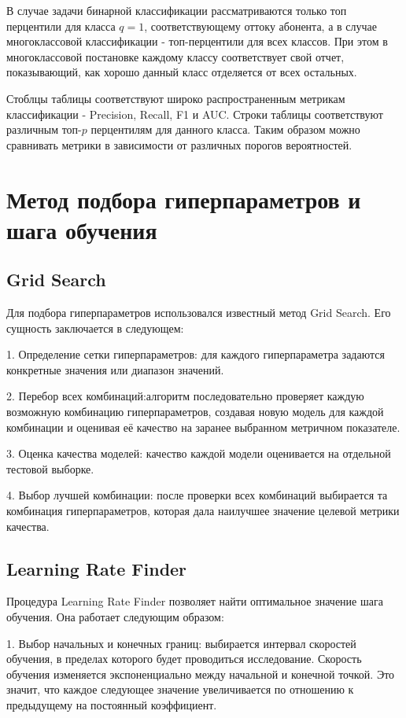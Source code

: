 \documentclass[a4paper,14pt,oneside,openany]{memoir}
\begin{document}
В случае задачи бинарной классификации рассматриваются только топ перцентили для класса $q = 1$, соответствующему оттоку абонента, а в случае многоклассовой классификации - топ-перцентили для всех классов. При этом в многоклассовой постановке каждому классу соответствует свой отчет, показывающий, как хорошо данный класс отделяется от всех остальных. 

Стоблцы таблицы соответствуют широко распространенным метрикам классификации - Precision, Recall, F1 и AUC. Строки таблицы соответствуют различным топ-$p$ перцентилям для данного класса. Таким образом можно сравнивать метрики в зависимости от различных порогов вероятностей. 

\section{Метод подбора гиперпараметров и шага обучения}

\subsection{Grid Search}

Для подбора гиперпараметров использовался известный метод Grid Search. Его сущность заключается в следующем: 

1. Определение сетки гиперпараметров: для каждого гиперпараметра задаются конкретные значения или диапазон значений. 

2. Перебор всех комбинаций:алгоритм последовательно проверяет каждую возможную комбинацию гиперпараметров, создавая новую модель для каждой комбинации и оценивая её качество на заранее выбранном метричном показателе.

3. Оценка качества моделей: качество каждой модели оценивается на отдельной тестовой выборке.

4. Выбор лучшей комбинации: после проверки всех комбинаций выбирается та комбинация гиперпараметров, которая дала наилучшее значение целевой метрики качества. 

\subsection{Learning Rate Finder}

Процедура Learning Rate Finder позволяет найти оптимальное значение шага обучения. Она работает следующим образом: 

1. Выбор начальных и конечных границ: выбирается интервал скоростей обучения, в пределах которого будет проводиться исследование. Скорость обучения изменяется экспоненциально между начальной и конечной точкой. Это значит, что каждое следующее значение увеличивается по отношению к предыдущему на постоянный коэффициент. 
\end{document}
